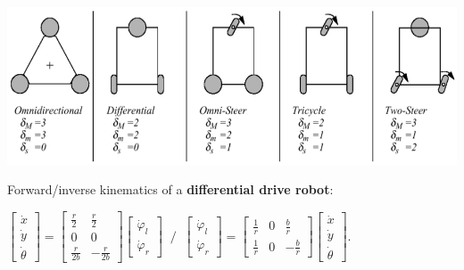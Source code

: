 \documentclass[landscape]{article}
\newcommand{\vmspace}{\vspace{-7pt}}
\newcommand{\vpspace}{\vspace{5pt}}
\begin{document}
\begin{multicols}{3}
\vpspace

\begin{minipage}{\columnwidth}
  \includegraphics[width=\columnwidth]{img/3_WheelTypes.png}
\end{minipage}

\begin{minipage}{\columnwidth}
  Forward/inverse kinematics of a \textbf{differential drive robot}:
  \vmspace
  \begin{center}
    $
    \left[
    \begin{matrix}
      \dot x \\
      \dot y \\
      \dot \theta
    \end{matrix}
    \right]
    =
    \left[
    \begin{matrix}
      \frac{r}{2} & \frac{r}{2} \\
      0 & 0 \\
      \frac{r}{2b} & -\frac{r}{2b}
    \end{matrix}
    \right]
    \left[
    \begin{matrix}
      \dot \varphi_l \\
      \dot \varphi_r
    \end{matrix}
    \right]
    \;\; / \;\;
    \left[
    \begin{matrix}
      \dot \varphi_l \\
      \dot \varphi_r
    \end{matrix}
    \right]
    =
    \left[
    \begin{matrix}
      \frac{1}{r} & 0 & \frac{b}{r} \\
      \frac{1}{r} & 0 & -\frac{b}{r}
    \end{matrix}
    \right]
    \left[
    \begin{matrix}
      \dot x \\
      \dot y \\
      \dot \theta
    \end{matrix}
    \right]
    $.
  \end{center}
\end{minipage}


\end{multicols}
\end{document}
